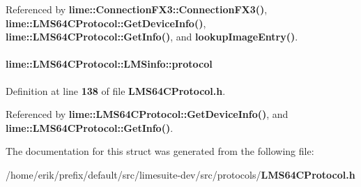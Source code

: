 Referenced by {\bf lime\+::\+Connection\+F\+X3\+::\+Connection\+F\+X3()}, {\bf lime\+::\+L\+M\+S64\+C\+Protocol\+::\+Get\+Device\+Info()}, {\bf lime\+::\+L\+M\+S64\+C\+Protocol\+::\+Get\+Info()}, and {\bf lookup\+Image\+Entry()}.

\paragraph[{protocol}]{ lime\+::\+L\+M\+S64\+C\+Protocol\+::\+L\+M\+Sinfo\+::protocol}\label{structlime_1_1LMS64CProtocol_1_1LMSinfo_aea83a6a95087f26e0baf282b0910657c}


Definition at line {\bf 138} of file {\bf L\+M\+S64\+C\+Protocol.\+h}.



Referenced by {\bf lime\+::\+L\+M\+S64\+C\+Protocol\+::\+Get\+Device\+Info()}, and {\bf lime\+::\+L\+M\+S64\+C\+Protocol\+::\+Get\+Info()}.



The documentation for this struct was generated from the following file\+:\begin{DoxyCompactItemize}
\item 
/home/erik/prefix/default/src/limesuite-\/dev/src/protocols/{\bf L\+M\+S64\+C\+Protocol.\+h}\end{DoxyCompactItemize}
